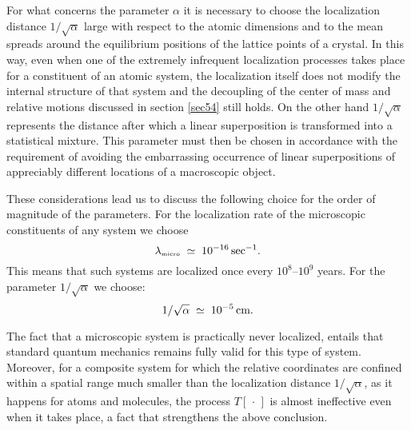 \documentclass[12pt]{article}
\begin{document}
For what concerns the parameter $\alpha$ it is necessary to choose
the localization distance $1/\sqrt{\alpha}$ large with respect to
the atomic dimensions and to the mean spreads around the
equilibrium positions of the lattice points of a crystal. In this
way, even when one of the extremely infrequent localization
processes takes place for a constituent of an atomic system, the
localization itself does not modify the internal structure of that
system and the decoupling of the center of mass and relative
motions discussed in section \ref{sec54} still holds. On the other
hand $1/\sqrt{\alpha}$ represents the distance after which a
linear superposition is transformed into a statistical mixture.
This parameter must then be chosen in accordance with the
requirement of avoiding the embarrassing occurrence of linear
superpositions of appreciably different locations of a macroscopic
object.

These considerations lead us to discuss the following choice for
the order of magnitude of the parameters. For the localization
rate of the microscopic constituents of any system we choose
\begin{equation}
\lambda_{\makebox{\tiny micro}} \; \simeq \; 10^{-16}\,
\makebox{sec}^{-1}.
\end{equation}
This means that such systems are localized once every
$10^{8}$--$10^{9}$ years. For the parameter $1/\sqrt{\alpha}$ we
choose:
\begin{equation}
1/\sqrt{\alpha} \; \simeq \; 10^{-5}\,\makebox{cm}.
\end{equation}

The fact that a microscopic system is practically never localized,
entails that standard quantum mechanics remains fully valid for
this type of system.  Moreover, for a composite system for which
the relative coordinates are confined within a spatial range much
smaller than the localization distance $1/\sqrt{\alpha}$, as it
happens for atoms and molecules, the process $T[\,\cdot\,]$ is
almost ineffective even when it takes place, a fact that
strengthens the above conclusion.
\end{document}
